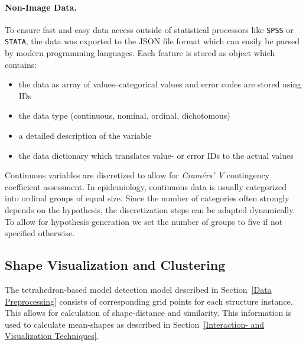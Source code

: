 \documentclass[journal]{style/vgtc} 			          %
\begin{document}
\paragraph{Non-Image Data.} 

To ensure fast and easy data access outside of statistical processors like \texttt{SPSS} or \texttt{STATA}, the data was exported to the JSON file format which can easily be parsed by modern programming languages.
%
Each feature is stored as object which contains: 
\begin{itemize}
	\item the data as array of values--categorical values and error codes are stored using IDs
	\item the data type (continuous, nominal, ordinal, dichotomous)
	\item a detailed description of the variable
	\item the data dictionary which translates value- or error IDs to the actual values
\end{itemize}
%
Continuous variables are discretized to allow for \emph{Cram\'{e}rs' V} contingency coefficient assessment.
%
In epidemiology, continuous data is usually categorized into ordinal groups of equal size.
%
Since the number of categories often strongly depends on the hypothesis, the discretization steps can be adapted dynamically.
%
To allow for hypothesis generation we set the number of groups to five if not specified otherwise.

\subsection{Shape Visualization and Clustering}
%
The tetrahedron-based model detection model described in Section~\ref{Data Preprocessing} consists of corresponding grid points for each structure instance.
%
This allows for calculation of shape-distance and similarity.
%
This information is used to calculate mean-shapes as described in Section~\ref{Interaction- and Visualization Techniques}.
\end{document}
